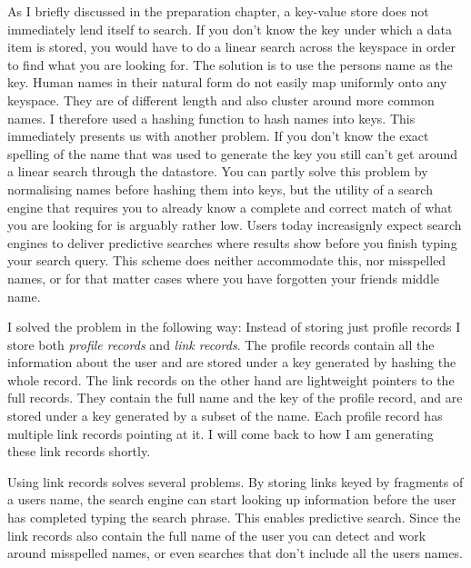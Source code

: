 As I briefly discussed in the preparation chapter, a key-value store does not immediately lend itself to search. If you don't know the key under which a data item is stored, you would have to do a linear search across the keyspace in order to find what you are looking for. The solution is to use the persons name as the key. Human names in their natural form do not easily map uniformly onto any keyspace. They are of different length and also cluster around more common names. I therefore used a hashing function to hash names into keys. This immediately presents us with another problem. If you don't know the exact spelling of the name that was used to generate the key you still can't get around a linear search through the datastore. You can partly solve this problem by normalising names before hashing them into keys, but the utility of a search engine that requires you to already know a complete and correct match of what you are looking for is arguably rather low. Users today increasignly expect search engines to deliver predictive searches where results show before you finish typing your search query. This scheme does neither accommodate this, nor misspelled names, or for that matter cases where you have forgotten your friends middle name.

I solved the problem in the following way: Instead of storing just profile records I store both \emph{profile records} and \emph{link records}. The profile records contain all the information about the user and are stored under a key generated by hashing the whole record. The link records on the other hand are lightweight pointers to the full records. They contain the full name and the key of the profile record, and are stored under a key generated by a subset of the name. Each profile record has multiple link records pointing at it. I will come back to how I am generating these link records shortly.

Using link records solves several problems. By storing links keyed by fragments of a users name, the search engine can start looking up information before the user has completed typing the search phrase. This enables predictive search. Since the link records also contain the full name of the user you can detect and work around misspelled names, or even searches that don't include all the users names.

